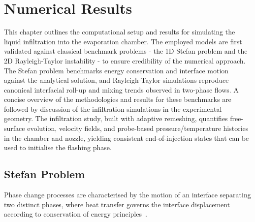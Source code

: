 \section{Numerical Results}\label{chap3}
This chapter outlines the computational setup and results for simulating the liquid infiltration 
into the evaporation chamber. The employed models are first validated against classical benchmark problems - 
the 1D Stefan problem and the 2D Rayleigh-Taylor instability - to ensure credibility 
of the numerical approach. The Stefan problem 
benchmarks energy conservation and interface motion against the analytical 
solution, and Rayleigh-Taylor simulations reproduce canonical interfacial 
roll-up and mixing trends observed in two-phase flows. 
A concise overview of the methodologies and results for these 
benchmarks are followed by discussion of the infiltration simulations in the experimental geometry.
The infiltration study, built with adaptive remeshing, quantifies free-surface evolution, 
velocity fields, and probe-based pressure/temperature histories in the chamber and nozzle, 
yielding consistent end-of-injection states that can be used to initialise the flashing phase.

\subsection{Stefan Problem}
\label{sec:stef}
Phase change processes are characterised by the motion of an interface 
separating two distinct phases, where heat transfer governs the interface
 displacement according to conservation of energy principles~\cite{Koga2020}.

